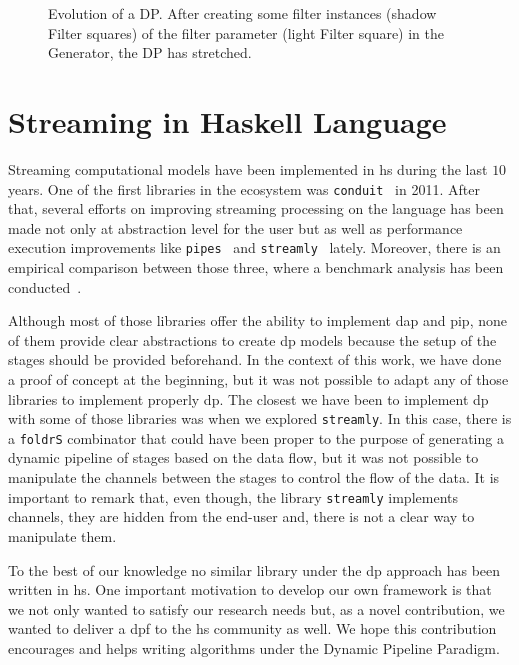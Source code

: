 \begin{figure}[h]
 \centering
 \caption[{[Pre] Evolution of DP}]{Evolution of a DP. After creating some filter instances (shadow Filter squares) of the filter parameter (light Filter square) in the Generator, the DP has stretched.}
\label{fig:activeDP}
\end{figure}


\section{Streaming in Haskell Language}
Streaming computational models have been implemented in \acrlong{hs} during the last $10$ years. One of the first libraries in the ecosystem was \texttt{conduit}~\cite{conduit} in 2011.
After that, several efforts on improving streaming processing on the language has been made not only at abstraction level for the user but as well as performance execution 
improvements like \texttt{pipes}~\cite{pipes} and \texttt{streamly}~\cite{streamly} lately.
Moreover, there is an empirical comparison between those three, where a benchmark analysis has been conducted~\cite{benchstreamhs}.

Although most of those libraries offer the ability to implement \acrshort{dap} and \acrshort{pip}, none of them provide clear abstractions to create \acrshort{dp} models because
the setup of the stages should be provided beforehand. In the context of this work, we have done a proof of concept at the beginning, 
but it was not possible to adapt any of those libraries to implement properly \acrshort{dp}. 
The closest we have been to implement \acrshort{dp} with some of those libraries was when we explored \texttt{streamly}.
In this case, there is a \texttt{foldrS} combinator that could have been proper to the purpose of generating a dynamic pipeline of stages based on the data flow, but it was not possible to manipulate the channels between the stages to control the flow of the data. It is important to remark that, even though, the  library  \texttt{streamly} implements channels, they are hidden from the end-user and, there is not a  clear way to manipulate them.

To the best of our knowledge no similar library under the  \acrshort{dp} approach has been written in \acrlong{hs}. 
One important motivation to develop our own framework is that  we not only  wanted to satisfy our research needs but, as a novel contribution, we wanted to deliver a \acrshort{dpf} to the \acrshort{hs} community as well. We hope this contribution encourages and helps writing algorithms under the Dynamic Pipeline Paradigm. 

